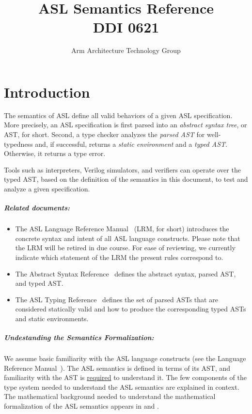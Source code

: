 \documentclass{book}
\author{Arm Architecture Technology Group}
\title{ASL Semantics Reference \\
       DDI 0621}
\begin{document}
\maketitle

\tableofcontents{}





\chapter{Introduction}

The semantics of ASL define all valid behaviors of a given ASL specification.
More precisely, an ASL specification is first parsed into an \emph{abstract syntax tree},
or AST, for short. Second, a type checker analyzes the \emph{parsed AST} for well-typedness and,
if successful, returns a \emph{static environment} and a \emph{typed AST}. Otherwise, it returns a type error.

Tools such as interpreters, Verilog simulators, and verifiers can operate over the typed AST, based on the definition
of the semantics in this document, to test and analyze a given specification.

\paragraph{Related documents:}
\begin{itemize}
  \item The ASL Language Reference Manual~\cite{LRM} (LRM, for short) introduces the concrete syntax and intent
  of all ASL language constructs.
  Please note that the LRM will be retired in due course. For ease of reviewing, we currently indicate which statement
  of the LRM the present rules correspond to.
  \item The Abstract Syntax Reference~\cite{ASLAbstractSyntaxReference} defines the abstract syntax, parsed AST, and typed AST.
  \item The ASL Typing Reference~\cite{ASLTypingReference} defines the set of parsed ASTs that are considered statically valid
  and how to produce the corresponding typed ASTs and static environments.
\end{itemize}

\paragraph{Undestanding the Semantics Formalization:}
We assume basic familiarity with the ASL language constructs (see the Language Reference Manual~\cite{LRM}).
The ASL semantics is defined in terms of its AST,
and familiarity with the AST is \underline{required} to understand it.
The few components of the type system needed to understand the ASL semantics are explained in context.
The mathematical background needed to understand the mathematical formalization
of the ASL semantics appears in  and .
\end{document}

